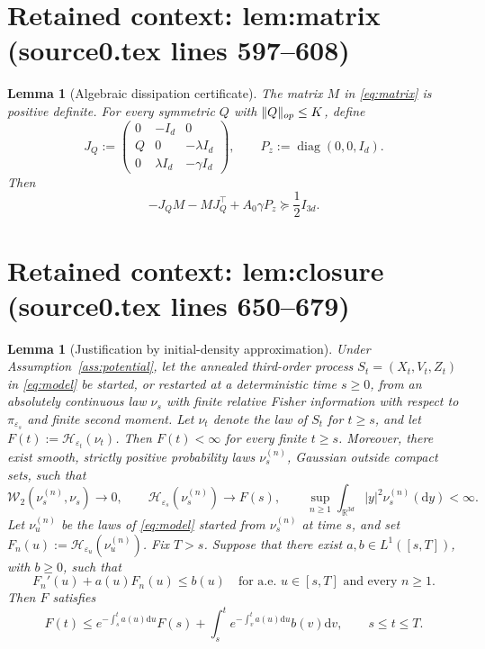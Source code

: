 \documentclass[10pt,a4paper]{amsart}
\newcommand{\Id}{I}
\newcommand{\R}{\mathbb R}
\newcommand{\cH}{\mathcal H}
\newcommand{\dd}{\mathrm d}
\newcommand{\eps}{\varepsilon}
\theoremstyle{plain}
\newtheorem{lemma}[theorem]{Lemma}
\theoremstyle{definition}
\begin{document}
\section*{Retained context: lem:matrix (source0.tex lines 597--608)}

\begin{lemma}[Algebraic dissipation certificate]\label{lem:matrix}
The matrix $M$ in \eqref{eq:matrix} is positive definite. For every symmetric $Q$ with
$\|Q\|_{\rm op}\leq K$, define
\[
 J_Q:=\begin{pmatrix}0&-\Id_{d}&0\\Q&0&-\lambda\Id_{d}\\0&\lambda\Id_{d}&-\gamma\Id_{d}\end{pmatrix},
 \qquad P_z:=\operatorname{diag}(0,0,\Id_d).
\]
Then
\begin{equation}\label{eq:certificate}
 -J_QM-MJ_Q^\top+A_0\gamma P_z\succeq\frac12\Id_{3d}.
\end{equation}
\end{lemma}


\section*{Retained context: lem:closure (source0.tex lines 650--679)}

\begin{lemma}[Justification by initial-density approximation]\label{lem:closure}
Under Assumption~\ref{ass:potential}, let the annealed third-order process
$S_t=(X_t,V_t,Z_t)$ in \eqref{eq:model} be started, or restarted
at a deterministic time $s\geq0$, from
an absolutely continuous law $\nu_s$ with finite relative Fisher information with
respect to $\pi_{\eps_s}$ and finite second moment. Let $\nu_t$ denote the
law of $S_t$ for $t\geq s$, and let $F(t):=\cH_{\eps_t}(\nu_t)$. Then
$F(t)<\infty$ for every finite $t\geq s$.
Moreover, there exist smooth, strictly positive probability laws
$\nu_s^{(n)}$, Gaussian outside compact sets, such that
\[
 \mathcal W_2\left(\nu_s^{(n)},\nu_s\right)\to0,\qquad
 \cH_{\eps_s}\left(\nu_s^{(n)}\right)\to F(s),\qquad
 \sup_{n\geq1}\int_{\R^{3d}}|y|^2\nu_s^{(n)}(\dd y)<\infty.
\]
Let $\nu_u^{(n)}$ be the laws of \eqref{eq:model} started from $\nu_s^{(n)}$
at time $s$, and set $F_n(u):=\cH_{\eps_u}\left(\nu_u^{(n)}\right)$.
Fix $T>s$.
Suppose that there exist $a,b\in L^1([s,T])$, with $b\geq0$, such that
\begin{equation}\label{eq:abstractcomparison}
 F_n'(u)+a(u)F_n(u)\leq b(u)
 \quad\text{for a.e. }u\in[s,T]\text{ and every }n\geq1.
\end{equation}
Then $F$ satisfies
\begin{equation}\label{eq:abstractintegrated}
 F(t)\leq e^{-\int_s^t a(u)\dd u}F(s)
 +\int_s^t e^{-\int_v^t a(u)\dd u}b(v)\dd v,
 \qquad s\leq t\leq T.
\end{equation}
\end{lemma}
\end{document}

